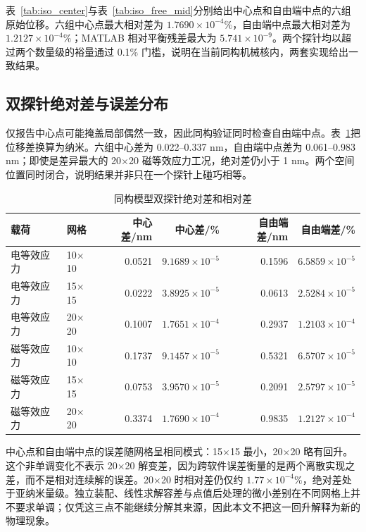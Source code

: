 \documentclass[UTF8,fontset=windows,11pt,a4paper]{ctexart}
\begin{document}
表~\ref{tab:iso_center}与表~\ref{tab:iso_free_mid}分别给出中心点和自由端中点的六组原始位移。六组中心点最大相对差为 $1.7690\times10^{-4}\%$，自由端中点最大相对差为 $1.2127\times10^{-4}\%$；MATLAB 相对平衡残差最大为 $5.741\times10^{-9}$。两个探针均以超过两个数量级的裕量通过 0.1\% 门槛，说明在当前同构机械核内，两套实现给出一致结果。

\subsection{双探针绝对差与误差分布}

仅报告中心点可能掩盖局部偶然一致，因此同构验证同时检查自由端中点。表~\ref{tab:iso_two_probe_error}把位移差换算为纳米。六组中心差为 0.022--0.337 nm，自由端中点差为 0.061--0.983 nm；即使是差异最大的 20$\times$20 磁等效应力工况，绝对差仍小于 1 nm。两个空间位置同时闭合，说明结果并非只在一个探针上碰巧相等。

\begin{table}[H]
\centering
\caption{同构模型双探针绝对差和相对差}
\label{tab:iso_two_probe_error}
\small
\begin{tabular}{llrrrr}
\toprule
载荷 & 网格 & 中心差/nm & 中心差/\% & 自由端差/nm & 自由端差/\% \\
\midrule
电等效应力 & 10$\times$10 & 0.0521 & $9.1689\!\times\!10^{-5}$ & 0.1596 & $6.5859\!\times\!10^{-5}$ \\
电等效应力 & 15$\times$15 & 0.0222 & $3.8925\!\times\!10^{-5}$ & 0.0613 & $2.5284\!\times\!10^{-5}$ \\
电等效应力 & 20$\times$20 & 0.1007 & $1.7651\!\times\!10^{-4}$ & 0.2937 & $1.2103\!\times\!10^{-4}$ \\
磁等效应力 & 10$\times$10 & 0.1737 & $9.1457\!\times\!10^{-5}$ & 0.5321 & $6.5707\!\times\!10^{-5}$ \\
磁等效应力 & 15$\times$15 & 0.0753 & $3.9570\!\times\!10^{-5}$ & 0.2091 & $2.5797\!\times\!10^{-5}$ \\
磁等效应力 & 20$\times$20 & 0.3374 & $1.7690\!\times\!10^{-4}$ & 0.9835 & $1.2127\!\times\!10^{-4}$ \\
\bottomrule
\end{tabular}
\end{table}

中心点和自由端中点的误差随网格呈相同模式：15$\times$15 最小，20$\times$20 略有回升。这个非单调变化不表示 20$\times$20 解变差，因为跨软件误差衡量的是两个离散实现之差，而不是相对连续解的误差。20$\times$20 时相对差仍仅约 $1.77\times10^{-4}\%$，绝对差处于亚纳米量级。独立装配、线性求解容差与点值后处理的微小差别在不同网格上并不要求单调；仅凭这三点不能继续分解其来源，因此本文不把这一回升解释为新的物理现象。
\end{document}
